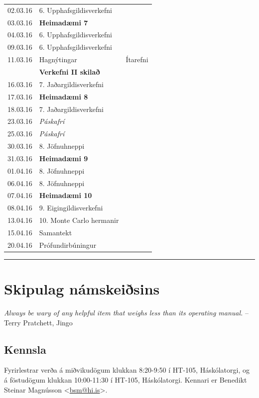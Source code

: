 \documentclass[A4paper,10pt,icelandic]{sphinxmanual}
\begin{document}
\begin{center}
\begin{tabular}{c|l|c}
02.03.16 & 6. Upphafsgildisverkefni & \\
03.03.16 & \textbf{Heimadæmi 7}&\\
04.03.16 & 6. Upphafsgildisverkefni & \\\hline
09.03.16 & 6. Upphafsgildisverkefni & \\
11.03.16 & Hagnýtingar & Ítarefni \\
 & \textbf{Verkefni II skilað} & \\
16.03.16 & 7. Jaðargildisverkefni & \\
17.03.16 & \textbf{Heimadæmi 8} & \\
18.03.16 & 7. Jaðargildisverkefni & \\\hline
23.03.16 & \emph{Páskafrí} & \\
25.03.16 & \emph{Páskafrí} & \\\hline
30.03.16 & 8. Jöfnuhneppi & \\
31.03.16 & \textbf{Heimadæmi 9} &\\
01.04.16 & 8. Jöfnuhneppi & \\\hline
06.04.16 & 8. Jöfnuhneppi & \\
07.04.16 & \textbf{Heimadæmi 10}\\
08.04.16 & 9. Eigingildisverkefni &\\\hline
13.04.16 & 10. Monte Carlo hermanir &\\
15.04.16 & Samantekt & \\\hline
20.04.16 & Prófundirbúningur & \\\hline
% 
\end{tabular}
\end{center}


\bigskip\hrule{}\bigskip

\newpage

\section{Skipulag námskeiðsins}
\label{vidauki:skipulag-namskeisins}
\emph{Always be wary of any helpful item that weighs less than its operating manual.}
-- Terry Pratchett, Jingo


\subsection{Kennsla}
\label{vidauki:kennsla}
Fyrirlestrar verða á miðvikudögum klukkan 8:20-9:50 í HT-105, Háskólatorgi, og á föstudögum klukkan 10:00-11:30 í HT-105, Háskólatorgi.
Kennari er Benedikt Steinar Magnússon \textless{}\href{mailto:bsm@hi.is}{bsm@hi.is}\textgreater{}.
\end{document}
